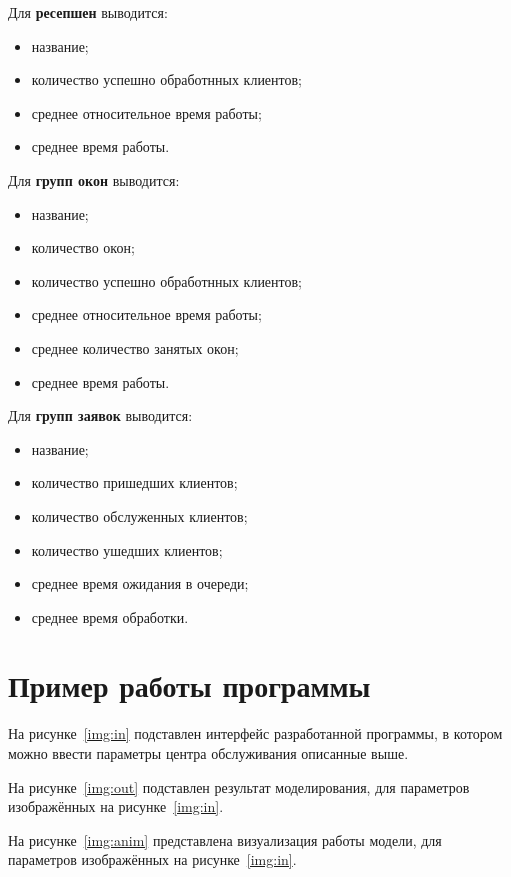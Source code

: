 Для \textbf{ресепшен} выводится:
\begin{itemize}[label=---]
	\item название;
	\item количество успешно обработнных клиентов;
	\item среднее относительное время работы;
	\item среднее время работы.
\end{itemize}

Для \textbf{групп окон} выводится:
\begin{itemize}[label=---]
	\item название;
	\item количество окон;
	\item количество успешно обработнных клиентов;
	\item среднее относительное время работы;
	\item среднее количество занятых окон;
	\item среднее время работы.
\end{itemize}

Для \textbf{групп заявок} выводится:
\begin{itemize}[label=---]
	\item название;
	\item количество пришедших клиентов;
	\item количество обслуженных клиентов;
	\item количество ушедших клиентов;
	\item среднее время ожидания в очереди;
	\item среднее время обработки.
\end{itemize}

\section{Пример работы программы}

На рисунке~\ref{img:in} подставлен интерфейс разработанной программы, в котором можно ввести параметры центра обслуживания описанные выше.

\FloatBarrier

На рисунке~\ref{img:out} подставлен результат моделирования, для параметров изображённых на рисунке~\ref{img:in}.

\FloatBarrier

На рисунке~\ref{img:anim} представлена визуализация работы модели, для параметров изображённых на рисунке~\ref{img:in}.

